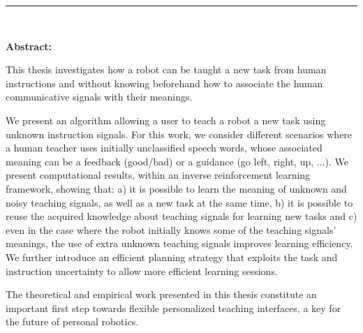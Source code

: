 
\begin{vcenterpage}
\noindent\rule[2pt]{\textwidth}{0.5pt}
\begin{center}
{\large\textbf{\thesistitle\\}}
\end{center}
{\large\textbf{Abstract:}} 

This thesis investigates how a robot can be taught a new task from human instructions and without knowing beforehand how to associate the human communicative signals with their meanings.

We present an algorithm allowing a user to teach a robot a new task using unknown instruction signals. For this work, we consider different scenarios where a human teacher uses initially unclassified speech words, whose associated meaning can be a feedback (good/bad) or a guidance (go left, right, up, ...). We present computational results, within an inverse reinforcement learning framework, showing that: a) it is possible to learn the meaning of unknown and noisy teaching signals, as well as a new task at the same time, b) it is possible to reuse the acquired knowledge about teaching signals for learning new tasks and c) even in the case where the robot initially knows some of the teaching signals' meanings, the use of extra unknown teaching signals improves learning efficiency. We further introduce an efficient planning strategy that exploits the task and instruction uncertainty to allow more efficient learning sessions.

The theoretical and empirical work presented in this thesis constitute an important first step towards flexible personalized teaching interfaces, a key for the future of personal robotics.



\end{vcenterpage}

